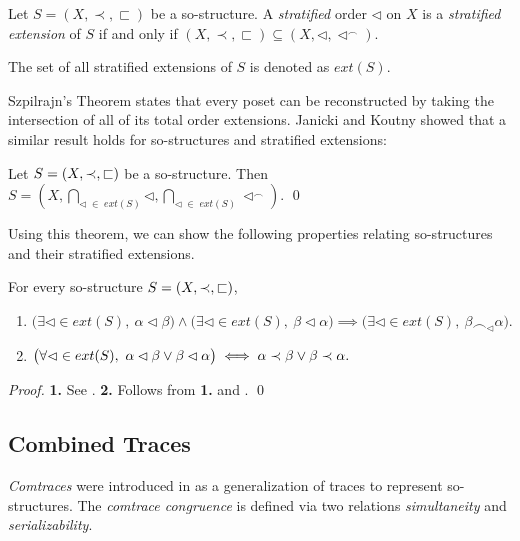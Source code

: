 \documentclass{llncs}
\begin{document}
\begin{definition}
Let $S=(X,\prec,\sqsubset)$ be a so-structure. A {\em stratified} order $\lhd$ on $X$ is a {\em stratified extension} of $S$ if and only if $(X,\prec,\sqsubset)\subseteq (X,\lhd,\lhd^{\frown})$. 

The set of all stratified extensions of $S$  is denoted as  $ext(S)$. \EOD
\label{def:extsos}
\end{definition}

Szpilrajn's Theorem \cite{Szp} states that every poset can be reconstructed by taking the intersection of all of its total order extensions. Janicki and Koutny showed that a similar result holds for so-structures and stratified extensions:

\begin{theorem}[{\cite{JK97}}]
Let $S=(X,\prec,\sqsubset)$ be a so-structure. Then\\
\mbox{\hspace{3.5cm}} $ S=\left(X,\bigcap_{\lhd\;\in\; ext(S)}\lhd,\bigcap_{\lhd\;\in\; ext(S)}\lhd^\frown\right).$
\qed
\label{theo:SzpStrat}
\end{theorem}

Using this theorem, we can show the following properties relating so-structures and their stratified extensions.
\begin{corollary}
For every so-structure $S=(X,\prec,\sqsubset)$,
\begin{enumerate}
 \item $\bigl(\exists \lhd\in ext(S),\ \alpha\lhd\beta\bigr)\wedge\bigl(\exists \lhd\in ext(S),\ \beta\lhd\alpha\bigr)\implies \bigl(\exists \lhd\in ext(S),\ \beta\frown_\lhd\alpha\bigr).$
 \item $\bigl(\forall \lhd\in ext(S),\ \alpha\lhd\beta \vee \beta\lhd\alpha\bigr)\iff \alpha \PO \beta \vee \beta \PO \alpha.$
\end{enumerate}
\label{cor:SzpStrat}
\end{corollary}
\begin{proof}\textbf{1. } See \cite[Theorem 3.6]{JK97}. \textbf{2. } Follows from \textbf{1.} and . \qed


\end{proof}


\subsection{Combined Traces}

{\em Comtraces} were introduced in \cite{JK95} as a generalization of traces to represent so-structures. The \emph{comtrace congruence} is defined via two relations {\em simultaneity} and {\em serializability}.
\end{document}
